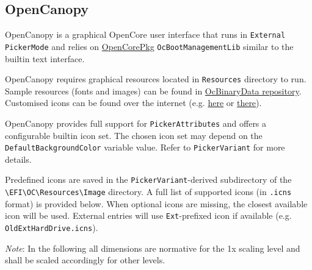 \documentclass[]{article}
\begin{document}
\subsection{OpenCanopy}\label{ueficanopy}

OpenCanopy is a graphical OpenCore user interface that runs in
\texttt{External} \texttt{PickerMode} and relies on
\href{https://github.com/acidanthera/OpenCorePkg}{OpenCorePkg} \texttt{OcBootManagementLib}
similar to the builtin text interface.

OpenCanopy requires graphical resources located in \texttt{Resources} directory to run.
Sample resources (fonts and images) can be found in
\href{https://github.com/acidanthera/OcBinaryData}{OcBinaryData repository}. Customised icons can be found over the internet
(e.g. \href{https://github.com/blackosx/OpenCanopyIcons}{here} or \href{https://applelife.ru/threads/kastomizacija-opencanopy.2945020/}{there}).

OpenCanopy provides full support for \texttt{PickerAttributes} and offers a configurable
builtin icon set. The chosen icon set may depend on the \texttt{DefaultBackgroundColor}
variable value. Refer to \texttt{PickerVariant} for more details.

Predefined icons are saved in the \texttt{PickerVariant}-derived subdirectory of the
\texttt{\textbackslash EFI\textbackslash OC\textbackslash Resources\textbackslash Image}
directory. A full list of supported icons (in \texttt{.icns} format) is provided below. When optional icons
are missing, the closest available icon will be used. External entries will use \texttt{Ext}-prefixed
icon if available (e.g. \texttt{OldExtHardDrive.icns}).

\emph{Note}: In the following all dimensions are normative for the 1x scaling level and shall be
scaled accordingly for other levels.
\end{document}
